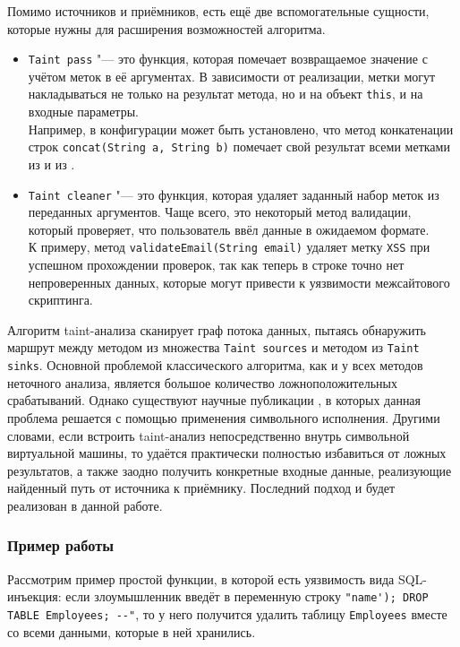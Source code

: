 Помимо источников и приёмников, есть ещё две вспомогательные сущности, которые нужны для расширения возможностей алгоритма.
\begin{itemize}
    \item \verb|Taint pass| "--- это функция, которая помечает возвращаемое значение с учётом меток в её аргументах. В зависимости от реализации, метки могут накладываться не только на результат метода, но и на объект \verb|this|, и на входные параметры. \\
    Например, в конфигурации может быть установлено, что метод конкатенации строк \verb|concat(String a, String b)| помечает свой результат всеми метками из  и из .
    \item \verb|Taint cleaner| "--- это функция, которая удаляет заданный набор меток из переданных аргументов. Чаще всего, это некоторый метод валидации, который проверяет, что пользователь ввёл данные в ожидаемом формате. \\
    К примеру, метод \verb|validateEmail(String email)| удаляет метку \verb|XSS| при успешном прохождении проверок, так как теперь в строке  точно нет непроверенных данных, которые могут привести к уязвимости межсайтового скриптинга.
\end{itemize}

Алгоритм taint-анализа сканирует граф потока данных, пытаясь обнаружить маршрут между методом из множества \verb|Taint sources| и методом из \verb|Taint sinks|. Основной проблемой классического алгоритма, как и у всех методов неточного анализа, является большое количество ложноположительных срабатываний. Однако существуют научные публикации \cite{sym-taint}, в которых данная проблема решается с помощью применения символьного исполнения. Другими словами, если встроить taint-анализ непосредственно внутрь символьной виртуальной машины, то удаётся практически полностью избавиться от ложных результатов, а также заодно получить конкретные входные данные, реализующие найденный путь от источника к приёмнику. Последний подход и будет реализован в данной работе.

\subsubsection{Пример работы}

Рассмотрим пример простой функции, в которой есть уязвимость вида SQL-инъекция: если злоумышленник введёт в переменную  строку \verb|"name'); DROP TABLE Employees; --"|, то у него получится удалить таблицу \verb|Employees| вместе со всеми данными, которые в ней хранились.

